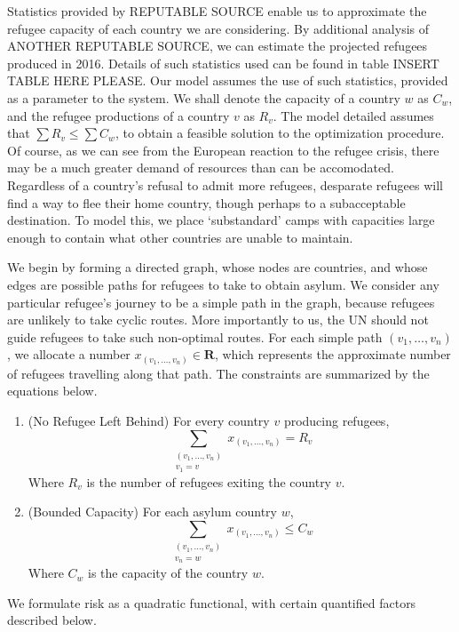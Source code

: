 \documentclass{article}
\begin{document}
Statistics provided by REPUTABLE SOURCE enable us to approximate the refugee capacity of each country we are considering. By additional analysis of ANOTHER REPUTABLE SOURCE, we can estimate the projected refugees produced in 2016. Details of such statistics used can be found in table INSERT TABLE HERE PLEASE. Our model assumes the use of such statistics, provided as a parameter to the system. We shall denote the capacity of a country $w$ as $C_w$, and the refugee productions of a country $v$ as $R_v$. The model detailed assumes that $\sum R_v \leq \sum C_w$, to obtain a feasible solution to the optimization procedure. Of course, as we can see from the European reaction to the refugee crisis, there may be a much greater demand of resources than can be accomodated. Regardless of a country's refusal to admit more refugees, desparate refugees will find a way to flee their home country, though perhaps to a subacceptable destination. To model this, we place `substandard' camps with capacities large enough to contain what other countries are unable to maintain.

We begin by forming a directed graph, whose nodes are countries, and whose edges are possible paths for refugees to take to obtain asylum. We consider any particular refugee's journey to be a simple path in the graph, because refugees are unlikely to take cyclic routes. More importantly to us, the UN should not guide refugees to take such non-optimal routes. For each simple path $(v_1, \dots, v_n)$, we allocate a number $x_{(v_1, \dots, v_n)} \in \mathbf{R}$, which represents the approximate number of refugees travelling along that path. The constraints are summarized by the equations below.

\begin{enumerate}
    \item (No Refugee Left Behind) For every country $v$ producing refugees,
    \[ \sum_{\substack{(v_1, \dots, v_n) \\ v_1 = v}} x_{(v_1, \dots, v_n)} = R_v \]
    Where $R_v$ is the number of refugees exiting the country $v$.

    \item (Bounded Capacity) For each asylum country $w$,
    \[ \sum_{\substack{(v_1, \dots, v_n) \\ v_n = w}} x_{(v_1, \dots, v_n)} \leq C_w \]
    Where $C_w$ is the capacity of the country $w$.
\end{enumerate}

We formulate risk as a quadratic functional, with certain quantified factors described below.
\end{document}
